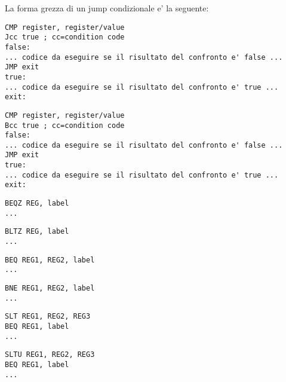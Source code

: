 \label{sec:Jcc}






\sectionold{\Conclusione{}}


La forma grezza di un jump condizionale e' la seguente:

\begin{lstlisting}[caption=x86]
CMP register, register/value
Jcc true ; cc=condition code
false:
... codice da eseguire se il risultato del confronto e' false ...
JMP exit 
true:
... codice da eseguire se il risultato del confronto e' true ...
exit:
\end{lstlisting}


\begin{lstlisting}[caption=ARM]
CMP register, register/value
Bcc true ; cc=condition code
false:
... codice da eseguire se il risultato del confronto e' false ...
JMP exit 
true:
... codice da eseguire se il risultato del confronto e' true ...
exit:
\end{lstlisting}


\begin{lstlisting}[caption=Check for zero]
BEQZ REG, label
...
\end{lstlisting}

\begin{lstlisting}[caption=Check for less than zero:]
BLTZ REG, label
...
\end{lstlisting}

\begin{lstlisting}[caption=Check for equal values]
BEQ REG1, REG2, label
...
\end{lstlisting}

\begin{lstlisting}[caption=Check for non-equal values]
BNE REG1, REG2, label
...
\end{lstlisting}

\begin{lstlisting}[caption=Check for less than{,} greater than (signed)]
SLT REG1, REG2, REG3
BEQ REG1, label
...
\end{lstlisting}

\begin{lstlisting}[caption=Check for less than{,} greater than (unsigned)]
SLTU REG1, REG2, REG3
BEQ REG1, label
...
\end{lstlisting}

